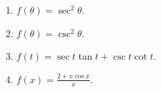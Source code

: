 \begin{multicols}{3}
\begin{enumerate}[ref={\fcProblemRef}]
\item $\displaystyle f(\theta)=\sec^2\theta$.

\item $\displaystyle f(\theta)=\csc^2\theta$.


\item $\displaystyle f(t)=\sec t \tan t +\csc t \cot t$.

\item $\displaystyle f(x)=\frac{2+x\cos x}{x}$.

\end{enumerate}
\end{multicols}